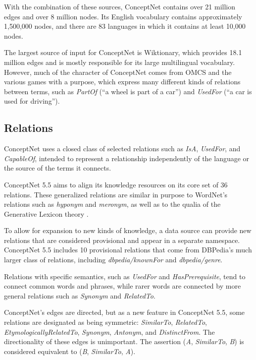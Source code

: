 \documentclass[letterpaper]{article}
\begin{document}
With the combination of these sources, ConceptNet contains over 21
million edges and over 8 million nodes. Its English vocabulary contains
approximately 1,500,000 nodes, and there are 83 languages in which it
contains at least 10,000 nodes.

The largest source of input for ConceptNet is Wiktionary, which provides
18.1 million edges and is mostly responsible for its large multilingual
vocabulary. However, much of the character of ConceptNet comes from OMCS
and the various games with a purpose, which express many different kinds
of relations between terms, such as \emph{PartOf} (``a wheel is part of
a car'') and \emph{UsedFor} (``a car is used for driving'').


\subsection{Relations}\label{relations}

ConceptNet uses a closed class of selected relations such as \emph{IsA},
\emph{UsedFor}, and \emph{CapableOf}, intended to
represent a relationship independently of the language or the source of
the terms it connects.

ConceptNet 5.5 aims to align its knowledge resources on its core set of 36
relations. These generalized relations are similar in purpose to WordNet's
relations such as \emph{hyponym} and \emph{meronym}, as well as to the qualia
of the Generative Lexicon theory \cite{pustejovsky1991generative}.

To allow for expansion to new kinds of knowledge, a data
source can provide new relations that are considered provisional and
appear in a separate namespace. ConceptNet 5.5 includes 10 provisional
relations that come from DBPedia's much larger class of relations,
including \emph{dbpedia/knownFor} and \emph{dbpedia/genre}.

Relations with specific semantics, such as \emph{UsedFor} and
\emph{HasPrerequisite}, tend to connect common words and phrases, while
rarer words are connected by more general relations such as
\emph{Synonym} and \emph{RelatedTo}.

ConceptNet's edges are directed, but as a new feature in ConceptNet 5.5,
some relations are designated as being symmetric: \emph{SimilarTo},
\emph{RelatedTo}, \emph{EtymologicallyRelatedTo}, \emph{Synonym},
\emph{Antonym}, and \emph{DistinctFrom}. The directionality of these
edges is unimportant. The assertion (\emph{A}, \emph{SimilarTo},
\emph{B}) is considered equivalent to (\emph{B}, \emph{SimilarTo},
\emph{A}).
\end{document}
